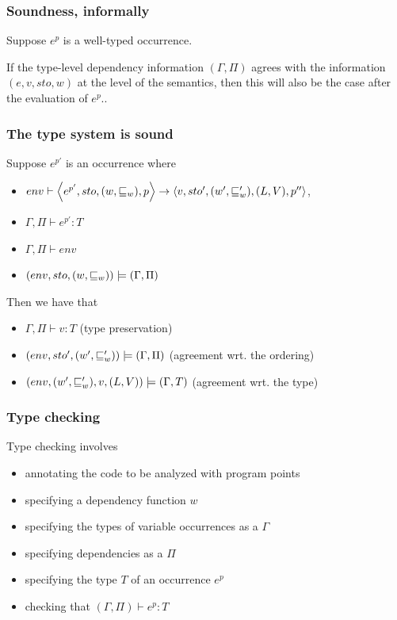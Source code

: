 \documentclass{beamer}
\begin{document}
\begin{frame}
  \frametitle{Soundness, informally}

Suppose $e^p$ is a well-typed occurrence.
  
If the type-level dependency information $(\Gamma,\Pi)$ agrees with
the information $(e,v,sto,w)$ at the level of the semantics, then this
will also be the case after the evaluation of $e^p$..
 
\end{frame}

\begin{frame}
  \frametitle{The type system is sound}

  \begin{theorem}[Soundness]
	Suppose $e^{p'}$ is an occurrence where
	\begin{itemize}
		\item $env\vdash\left\langle e^{p'},sto,(w,\sqsubseteq_w),p\right\rangle\rightarrow\left\langle v,sto',(w',\sqsubseteq_w'),(L,V),p''\right\rangle$,
		\item $\Gamma,\Pi\vdash e^{p'} : T$
		\item $\Gamma,\Pi\vdash env$
		\item $(env,sto,(w,\sqsubseteq_w))\models(\Gamma,\Pi)$
	\end{itemize}
	Then we have that
	\begin{itemize}
		\item $\Gamma,\Pi\vdash v:T$   \alert{(type preservation)}
		\item $(env,sto',(w',\sqsubseteq_w'))\models(\Gamma,\Pi)$
                  \alert{(agreement wrt. the ordering)}
                  
		\item $(env,(w',\sqsubseteq_w'),v,(L,V))\models(\Gamma,T)$  \alert{(agreement wrt. the type)}
	\end{itemize}
      \end{theorem}
      
\end{frame}

\begin{frame}
  \frametitle{Type checking}

  Type checking involves
  
  \begin{itemize}
  \item annotating the code to be analyzed with program points
  \item specifying a dependency function $w$
  \item specifying the types of variable occurrences as a $\Gamma$
 \item specifying dependencies as a $\Pi$
  \item specifying the type $T$ of an occurrence $e^p$
  \item checking that $(\Gamma,\Pi) \vdash e^p : T$
  \end{itemize}

\end{frame}
\end{document}
